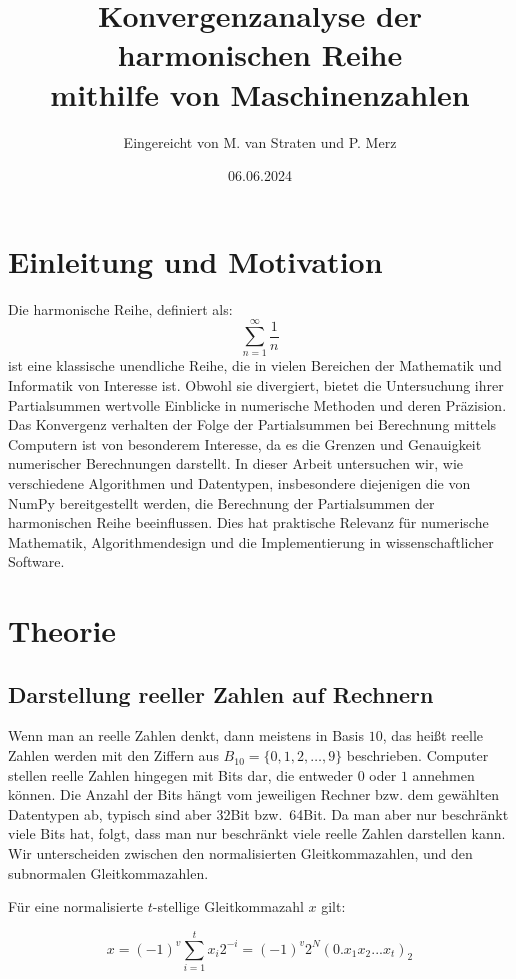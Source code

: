 \documentclass{scrartcl}
\title{Konvergenzanalyse der harmonischen Reihe\\
mithilfe von Maschinenzahlen}
\author{
  Eingereicht von M. van Straten und P. Merz
}
\date{06.06.2024}
\begin{document}
\maketitle
\cleardoublepage{}
\tableofcontents
\cleardoublepage{}

\section{Einleitung und Motivation}
Die harmonische Reihe, definiert als: \[ \sum_{n=1}^{\infty} \frac{1}{n} \] ist
eine klassische unendliche Reihe, die in vielen Bereichen der Mathematik und
Informatik von Interesse ist.
Obwohl sie divergiert, bietet die Untersuchung ihrer Partialsummen wertvolle
Einblicke in numerische Methoden und deren Präzision.
Das Konvergenz verhalten der Folge der Partialsummen bei Berechnung mittels
Computern ist von besonderem Interesse, da es die Grenzen und Genauigkeit
numerischer Berechnungen darstellt.
In dieser Arbeit untersuchen wir, wie verschiedene Algorithmen und Datentypen,
insbesondere diejenigen die von NumPy bereitgestellt werden, die Berechnung der
Partialsummen der harmonischen Reihe beeinflussen.
Dies hat praktische Relevanz für numerische Mathematik, Algorithmendesign und
die Implementierung in wissenschaftlicher Software.

\section{Theorie}
\subsection{Darstellung reeller Zahlen auf Rechnern}
Wenn man an reelle Zahlen denkt, dann meistens in Basis \(10\), das heißt
reelle Zahlen werden mit den Ziffern aus \(B_{10} = \{0, 1, 2, \dots, 9\} \)
beschrieben.
Computer stellen reelle Zahlen hingegen mit Bits dar, die entweder \(0\) oder
\(1\) annehmen können.
Die Anzahl der Bits hängt vom jeweiligen Rechner bzw.
dem gewählten Datentypen
ab, typisch sind aber 32Bit bzw.\ 64Bit.
Da man aber nur beschränkt viele Bits hat, folgt, dass man nur beschränkt viele
reelle Zahlen darstellen kann.
Wir unterscheiden zwischen den normalisierten Gleitkommazahlen, und den
subnormalen Gleitkommazahlen.
\begin{flushleft}
    Für eine normalisierte \(t\)-stellige Gleitkommazahl \(x\) gilt:
\end{flushleft} \[ x = (-1)^{v}\sum_{i=1}^{t} x_i 2^{-i} = (-1)^v 2^N (0.x_1x_2
    .
    .. x_t)_2 \]
\end{document}
